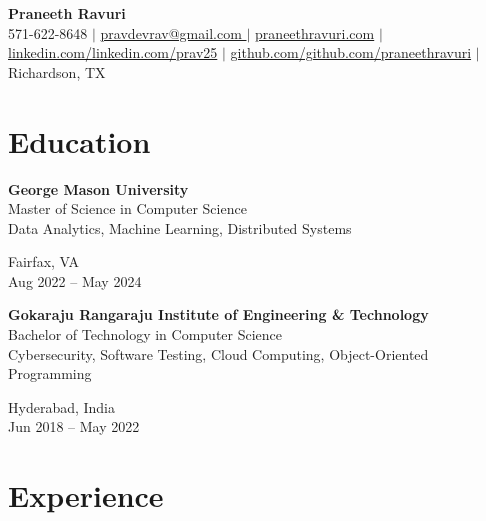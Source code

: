 \documentclass[10pt,a4paper]{article}
\newcommand{\dateplace}[2]{\raggedleft #1 \\ #2 \par}
\newcommand{\role}[2]{\raggedright \textbf{#1} \\ #2 \par}
\begin{document}
\begin{center}
    \textbf{\Large Praneeth Ravuri}\\
    \vspace{0.2em}
    571-622-8648 $|$
    \href{mailto:pravdevrav@gmail.com}{ pravdevrav@gmail.com } $|$
    \href{https://praneethravuri.com}{praneethravuri.com} $|$
    \href{https://www.linkedin.com/linkedin.com/prav25}{linkedin.com/linkedin.com/prav25} $|$
    \href{https://www.github.com/github.com/praneethravuri}{github.com/github.com/praneethravuri} $|$
    Richardson, TX
\end{center}
\vspace{-0.3em}

\section*{Education}
\vspace{0.5em}

\begin{minipage}[t]{0.70\textwidth}
    \role{George Mason University}{Master of Science in Computer Science\\Data Analytics, Machine Learning, Distributed Systems}
\end{minipage}
\begin{minipage}[t]{0.29\textwidth}
    \dateplace{Fairfax, VA}{Aug 2022 -- May 2024}
\end{minipage}
\vspace{0.5em}


\begin{minipage}[t]{0.70\textwidth}
    \role{Gokaraju Rangaraju Institute of Engineering & Technology}{Bachelor of Technology in Computer Science\\Cybersecurity, Software Testing, Cloud Computing, Object-Oriented Programming}
\end{minipage}
\begin{minipage}[t]{0.29\textwidth}
    \dateplace{Hyderabad, India}{Jun 2018 -- May 2022}
\end{minipage}
\vspace{0.5em}


\section*{Experience}
\vspace{0.5em}
\end{document}
